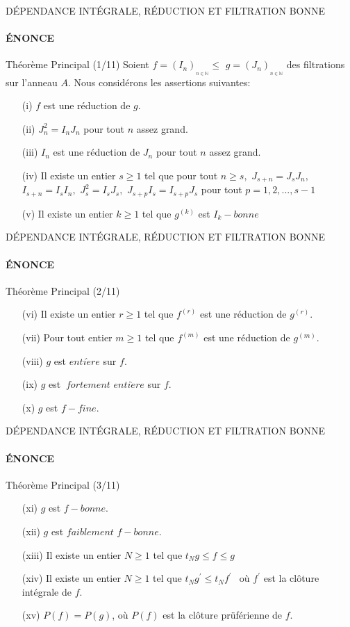 \documentclass[11pt,a4paper]{beamer}
\begin{document}
\begin{frame}{DÉPENDANCE INTÉGRALE, RÉDUCTION ET FILTRATION BONNE}
	\framesubtitle{ÉNONCE}
	\begin{block}{Théorème Principal (1/11)}
	Soient $f=(I_{n})_{_{n\in \mathbb{N}}}\leq $ $g=(J_{n})_{_{n\in \mathbb{N}}}$ des filtrations sur l'anneau $A.$ Nous considérons les assertions suivantes:
		\begin{enumerate}
			\item[(i)] $f$ est une réduction de $g.$
			\item[(ii)] $J_{n}^{2}=I_{n}J_{n}$ pour tout $n$ assez grand.
			\item[(iii)] $I_{n}$ est une réduction de $J_{n}$ pour tout $n$ assez grand.
			\item[(iv)] Il existe un entier $s\geq 1$ tel que pour tout $n\geq s,$ $J_{s+n}=J_{s}J_{n},$
			$I_{s+n}=I_{s}I_{n},$ $J_{s}^{2}=I_{s}J_{s},$ $J_{s+p}I_{s}=I_{s+p}J_{s}$ pour tout $p=1,2,...,s-1$
			\item[(v)] Il existe un entier $k\geq 1$ tel que $g^{(k)}$ est $I_{k}-bonne$
		\end{enumerate}
	\end{block}
\end{frame}

\begin{frame}{DÉPENDANCE INTÉGRALE, RÉDUCTION ET FILTRATION BONNE}
	\framesubtitle{ÉNONCE}
	\begin{block}{Théorème Principal (2/11)}
		\begin{enumerate}
	\item[(vi)] Il existe un entier $r\geq 1$ tel que $f^{(r)}$ est une réduction de $g^{(r)}.$
			\item[(vii)] Pour tout entier $m\geq 1$ tel que $f^{(m)}$ est une réduction de $g^{(m)}.$
			\item[(viii)] $g$ est $enti\grave{e}re$ sur $f.$
			\item[(ix)] $g$ est $\ fortement$ $enti\grave{e}re$ sur $f.$
			\item[(x)] $g$ est $f-fine.$
		\end{enumerate}
	\end{block}
\end{frame}

\begin{frame}{DÉPENDANCE INTÉGRALE, RÉDUCTION ET FILTRATION BONNE}
	\framesubtitle{ÉNONCE}
	\begin{block}{Théorème Principal (3/11)}
		\begin{enumerate}
			\item[(xi)] $g$ est $f-bonne.$
			\item[(xii)] $g$ est $faiblement$ $f-bonne.$
			\item[(xiii)] Il existe un entier $N\geq 1$ tel que $t_{N}g\leq f\leq g$
			\item[(xiv)] Il existe un entier $N\geq 1$ tel que $t_{N}g^{\prime }\leq
			t_{N}f^{\prime \text{ }}$ où $f^{\prime }$ est la clôture intégrale de $f.$
			\item[(xv)] $P(f)=P(g)$, où $P(f)$ est la clôture prüférienne de $f.$
		\end{enumerate}
	\end{block}
\end{frame}
\end{document}
